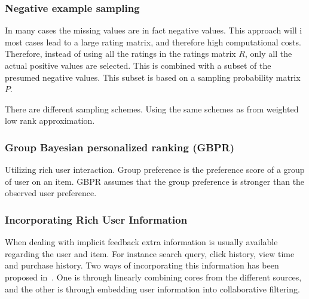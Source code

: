\subsubsection{Negative example sampling~\cite{pan2008}}
    In many cases the missing values are in fact negative values.  This approach
    will i most cases lead to a large rating matrix, and therefore high
    computational costs.  Therefore, instead of using all the ratings in the
    ratings matrix $R$, only all the actual positive values are selected.  This is
    combined with a subset of the presumed negative values.  This subset is based
    on a sampling probability matrix $P$.

    There are different sampling schemes.
    Using the same schemes as from weighted low rank approximation.

\subsubsection{Group Bayesian personalized ranking (GBPR)~\cite{Pan:2013:GGP:2540128.2540516}}
    Utilizing rich user interaction.  Group preference is the preference score of a
    group of user on an item.  GBPR assumes that the group preference is stronger
    than the observed user preference.

\subsubsection{Incorporating Rich User Information~\cite{deLace2010,Li2013}}
    When dealing with implicit feedback extra information is usually available
    regarding the user and item.  For instance search query, click history, view
    time and purchase history.  Two ways of incorporating this information has been
    proposed in~\cite{deLace2010}.  One is through linearly combining cores from
    the different sources, and the other is through embedding user information into
    collaborative filtering.


